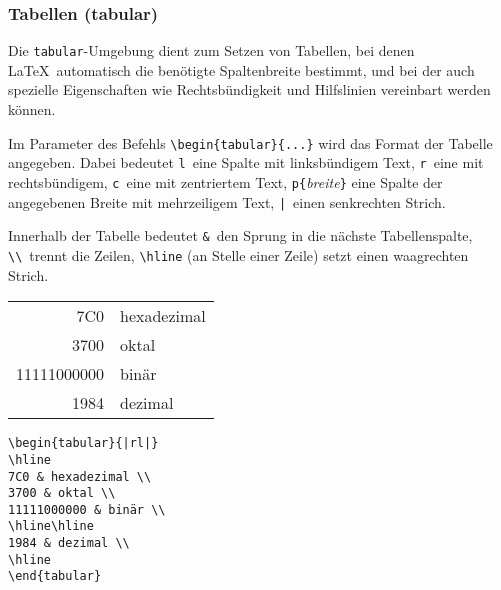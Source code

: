 \subsubsection{Tabellen (tabular)} \label{tabular}
 
Die \texttt{tabular}-Umgebung dient zum Setzen von Tabellen, bei
denen \LaTeX\ automatisch die benötigte Spaltenbreite
bestimmt, und bei der auch spezielle Eigenschaften wie
Rechtsbündigkeit und Hilfslinien vereinbart werden können.
 
Im Parameter des Befehls \verb|\begin{tabular}{...}| wird das
Format der Tabelle angegeben.
Dabei bedeutet
\texttt{l}~eine Spalte mit linksbündigem Text,
\texttt{r}~eine mit rechtsbündigem,
\texttt{c}~eine mit zentriertem Text,
\verb|p{|\textit{breite}\verb|}| eine Spalte der angegebenen
Breite mit mehrzeiligem Text,
\verb.|.~einen senkrechten Strich.
 
Innerhalb der Tabelle bedeutet
\verb|&|~den Sprung in die nächste Tabellenspalte,
\verb|\\|~trennt die Zeilen,
\verb|\hline| (an Stelle einer Zeile) setzt einen waagrechten
Strich.
 
          \vspace{0pt plus 1cm}
\exa
\begin{tabular}[t]{|rl|}
\hline
7C0 & hexadezimal \\
3700 & oktal \\
11111000000 & binär \\
\hline\hline
1984 & dezimal \\
\hline
\end{tabular}
\exb
\begin{verbatim}
\begin{tabular}{|rl|}
\hline
7C0 & hexadezimal \\
3700 & oktal \\
11111000000 & binär \\
\hline\hline
1984 & dezimal \\
\hline
\end{tabular}
\end{verbatim}
\exc
 
\endinput
